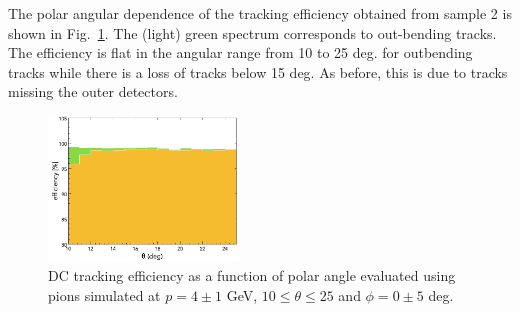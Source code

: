 The polar angular dependence of the tracking efficiency obtained from sample 2 is shown in Fig.~\ref{fig:trkeffinoutb}.   The (light) green spectrum corresponds to out-bending tracks.  The efficiency is flat in the angular range from 10 to 25 deg. for outbending tracks while there is a loss of tracks below 15 deg.  As before, this is due to tracks missing the outer detectors.  

\begin{figure}
\includegraphics[width=0.45\textwidth]{pics/DCTrkEffvsThetaInandOutbenders.png}
\caption{DC tracking efficiency as a function of polar angle evaluated using  pions  simulated at $p=4\pm 1$ GeV, $10\leq \theta\leq 25$ and $\phi = 0 \pm 5$ deg.
}
\label{fig:trkeffinoutb}
\end{figure}
